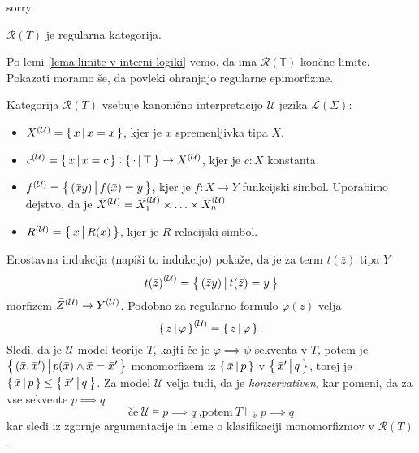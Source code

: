 \documentclass[../kategoricna_logika.tex]{subfiles}
\begin{document}
\begin{dokaz}
  sorry.
\end{dokaz}
\begin{trditev}
  $\mathcal{R}(T)$ je regularna kategorija.
\end{trditev}
\begin{dokaz}
  Po lemi \ref{lema:limite-v-interni-logiki} vemo, da ima $\mathcal{R}(\mathbb{T})$
  končne limite. Pokazati moramo še, da povleki ohranjajo regularne epimorfizme.
\end{dokaz}
\begin{definicija}
  Kategorija $\mathcal{R}(T)$ vsebuje kanonično interpretacijo $\mathcal{U}$ jezika $\mathcal{L}(\Sigma)$:
  \begin{itemize}
    \item $\interp[\mathcal{U}]{X} = \set{x\,\middle|\, x = x}$, kjer je $x$ spremenljivka tipa $X$.
    \item $\interp[\mathcal{U}]{c} = \set{x\,\middle|\, x = c} : \set{\cdot\,\middle|\, \top} \to \interp[\mathcal{U}]{X}$, kjer je $c:X$ konstanta.
    \item $\interp[\mathcal{U}]{f} = \set{(\bar{x}y)\,\middle|\, f(\bar{x}) = y}$,
      kjer je $f : \bar{X}\to Y$ funkcijski simbol. Uporabimo dejstvo, da je $\bar{X}^{(\mathcal{U})} = \interp[\mathcal{U}]{\bar{X}_1} \times \ldots \times \interp[\mathcal{U}]{\bar{X}_n}$
    \item $\interp[\mathcal{U}]{R} = \set{\bar{x}\,\middle|\, R(\bar{x})}$, kjer je $R$ relacijski simbol.
  \end{itemize}
\end{definicija}
\noindent
Enostavna indukcija (napiši to indukcijo) pokaže, da je za term $t(\bar{z})$ tipa $Y$
$$\caninterp{t(\bar{z})} = \set{(\bar{z}y)\,\middle|\, t(\bar{z}) = y}$$
morfizem $\caninterp{\bar{Z}} \to \caninterp{Y}$. Podobno za regularno formulo $\varphi(\bar{z})$ velja 
$$\caninterp{\set{\bar{z}\,\middle|\, \varphi}} = \set{\bar{z}\,\middle|\, \varphi}.$$
Sledi, da je $\mathcal{U}$ model teorije $T$, kajti če je $\varphi \implies \psi$ sekventa v $T$,
potem je $\set{(\bar{x}, \bar{x}')\,\middle|\, p(\bar{x}) \wedge \bar{x}= \bar{x}'}$
monomorfizem iz $\set{\bar{x}\,\middle|\, p}$ v $\set{\bar{x}'\,\middle|\, q}$,
torej je $\set{\bar{x}\,\middle|\, p} \leq \set{\bar{x}'\,\middle|\, q}$.
Za model $\mathcal{U}$ velja tudi, da je \emph{konzervativen}, kar pomeni,
da za vse sekvente $p \implies q$
$$\text{če} \ \mathcal{U} \models p \implies q \ \text{,potem} \ T \vdash_{\bar{x}} p \implies q$$
kar sledi iz zgornje argumentacije in leme o klasifikaciji monomorfizmov v $\mathcal{R}(T)$.
\end{document}
